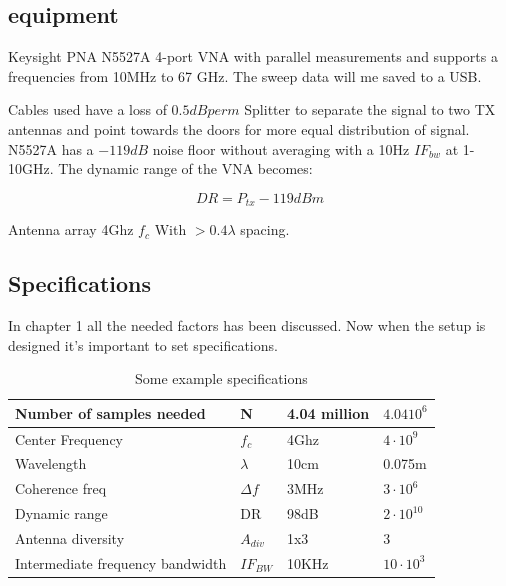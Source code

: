 \subsection{equipment}
\label{equip}
Keysight PNA N5527A 4-port VNA with parallel measurements and supports a frequencies from 10MHz to 67 GHz. The sweep data will me saved to a USB.

Cables used have a loss of $0.5dB per m$ 
Splitter to separate the signal to two TX antennas and point towards the doors for more equal distribution of signal.
N5527A has a $-119dB$ noise floor without averaging with a 10Hz $IF_{bw}$ at 1-10GHz. The dynamic range of the VNA becomes:

\begin{equation}
DR = P_{tx}-119dBm 
\label{NFvna}
\end{equation}

Antenna array 4Ghz $f_c$ With $>0.4 \lambda$ spacing.

\subsection{Specifications}
In chapter 1 all the needed factors has been discussed. Now when the setup is designed it's important to set specifications.
\begin{table}[H]
\centering
\caption{Some example specifications}
\label{final_specs}
\begin{tabular}{|l|l|l|l|}
\hline
Number of samples needed         & N           & 4.04 million   & $4.04 10^6$        \\ \hline
Center Frequency                 & $f_c$       & 4Ghz           & $4 \cdot 10^9$     \\ \hline
Wavelength                       & $\lambda$   & 10cm           & 0.075m               \\ \hline
Coherence freq                   & $\Delta f$  & 3MHz           & $3 \cdot 10^6$     \\ \hline
Dynamic range                    & DR          & 98dB           & $2\cdot 10^10$             \\ \hline
Antenna diversity                & $A_{div}$   & 1x3            & 3                  \\ \hline
Intermediate frequency bandwidth & $IF_{BW}$     & 10KHz          & $10 \cdot 10^3$ \\ \hline
\end{tabular}
\end{table}
